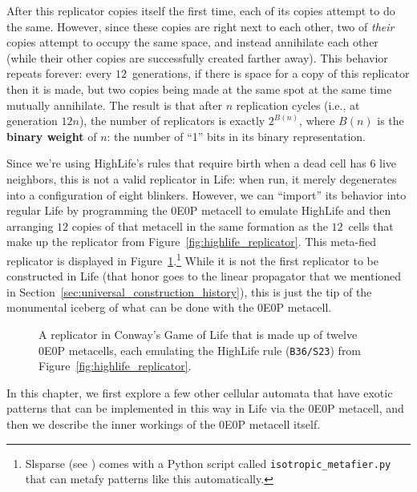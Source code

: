 After this replicator copies itself the first time, each of its copies attempt to do the same. However, since these copies are right next to each other, two of \emph{their} copies attempt to occupy the same space, and instead annihilate each other (while their other copies are successfully created farther away). This behavior repeats forever: every $12$~generations, if there is space for a copy of this replicator then it is made, but two copies being made at the same spot at the same time mutually annihilate. The result is that after $n$ replication cycles (i.e., at generation $12n$), the number of replicators is exactly $2^{B(n)}$, where $B(n)$ is the \textbf{binary weight} of $n$: the number of ``1'' bits in its binary representation.

Since we're using HighLife's rules that require birth when a dead cell has $6$ live neighbors, this is not a valid replicator in Life: when run, it merely degenerates into a configuration of eight blinkers. However, we can ``import'' its behavior into regular Life by programming the 0E0P metacell to emulate HighLife and then arranging $12$ copies of that metacell in the same formation as the $12$~cells that make up the replicator from Figure~\ref{fig:highlife_replicator}. This meta-fied replicator is displayed in Figure~\ref{fig:meta_replicator}.\footnote{Slsparse (see ) comes with a Python script called \texttt{isotropic\_metafier.py} that can metafy patterns like this automatically.} While it is not the first replicator to be constructed in Life (that honor goes to the linear propagator that we mentioned in Section~\ref{sec:universal_construction_history}), this is just the tip of the monumental iceberg of what can be done with the 0E0P metacell.

\begin{figure}[!htb]
	\centering
	\caption{A replicator in Conway's Game of Life that is made up of twelve 0E0P metacells, each emulating the HighLife rule (\texttt{B36/S23}) from Figure~\ref{fig:highlife_replicator}.}\label{fig:meta_replicator}
\end{figure}

In this chapter, we first explore a few other cellular automata that have exotic patterns that can be implemented in this way in Life via the 0E0P metacell, and then we describe the inner workings of the 0E0P metacell itself.


